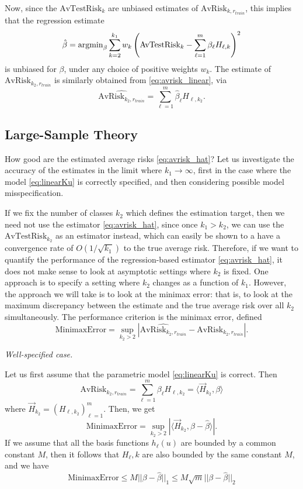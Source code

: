 \documentclass[12pt]{article}
\begin{document}
Now, since the $\text{AvTestRisk}_k$ are unbiased estimates of
$\text{AvRisk}_{k, r_{train}}$, this implies that the regression
estimate
\[
\hat{\beta} = \text{argmin}_\beta \sum_{k=2}^{k_1} w_k \left(\text{AvTestRisk}_k - \sum_{\ell=1}^m \beta_\ell H_{\ell, k}\right)^2
\]
is unbiased for $\beta$, under any choice of positive weights $w_k$.
The estimate of $\text{AvRisk}_{k_2,r_{train}}$ is similarly obtained
from \eqref{eq:avrisk_linear}, via
\begin{equation}\label{eq:avrisk_hat}
\widehat{\text{AvRisk}_{k_2,r_{train}}} = \sum_{\ell=1}^m \hat{\beta}_\ell H_{\ell, k_2}.
\end{equation}

\subsection{Large-Sample Theory}

How good are the estimated average risks \eqref{eq:avrisk_hat}?  Let
us investigate the accuracy of the estimates in the limit where
$k_1 \to \infty$, first in the case where the
model \eqref{eq:linearKu} is correctly specified, and then considering
possible model misspecification.

If we fix the number of classes $k_2$ which defines the estimation
target, then we need not use the estimator \eqref{eq:avrisk_hat},
since once $k_1 > k_2$, we can use the $\text{AvTestRisk}_{k_2}$ as an
estimator instead, which can easily be shown to a have a convergence
rate of $O(1/\sqrt{k_1})$ to the true average risk.  Therefore, if we
want to quantify the performance of the regression-based
estimator \eqref{eq:avrisk_hat}, it does not make sense to look at
asymptotic settings where $k_2$ is fixed.  One approach is to specify
a setting where $k_2$ changes as a function of $k_1$.  However, the
approach we will take is to look at the minimax error: that is, to
look at the maximum discrepancy between the estimate and the true
average risk over all $k_2$ simultaneously.  The performance criterion
is the minimax error, defined
\begin{equation}\label{eq:minimax_error}
\text{MinimaxError} = \sup_{k_2 > 2} |\widehat{\text{AvRisk}_{k_2,r_{train}}} - \text{AvRisk}_{k_2,r_{train}}|.
\end{equation}

\noindent\emph{Well-specified case.}

Let us first assume that the parametric model \eqref{eq:linearKu} is correct. Then
\[
\text{AvRisk}_{k_2,r_{train}} = \sum_{\ell=1}^m \beta_\ell H_{\ell, k_2} = \langle \vec{H}_{k_2}, \beta \rangle
\]
where $\vec{H}_{k_2} = (H_{\ell, k_2})_{\ell=1}^m$.
Then, we get
\[
\text{MinimaxError} = \sup_{k_2 > 2} |\langle \vec{H}_{k_2}, \beta - \hat{\beta}\rangle|.
\]
If we assume that all the basis functions $h_\ell(u)$ are bounded by a
common constant $M$, then it follows that $H_\ell, k$ are also bounded by the same constant $M$,
and we have
\[
\text{MinimaxError} \leq M ||\beta - \hat{\beta}||_1 \leq M \sqrt{m}||\beta - \hat{\beta}||_2
\]
\end{document}
